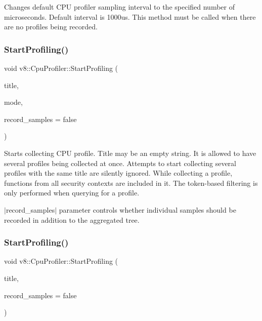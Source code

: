 Changes default C\+PU profiler sampling interval to the specified number of microseconds. Default interval is 1000us. This method must be called when there are no profiles being recorded. \mbox{\label{classv8_1_1CpuProfiler_a65ff4a18ab14143e094e2ea189facabd}} 
\subsubsection{\texorpdfstring{Start\+Profiling()}{StartProfiling()}\hspace{0.1cm}{\footnotesize\ttfamily [1/2]}}
{\footnotesize\ttfamily void v8\+::\+Cpu\+Profiler\+::\+Start\+Profiling (\begin{DoxyParamCaption}\item[{\mbox{\hyperlink{classv8_1_1Local}{Local}}$<$ \mbox{\hyperlink{classv8_1_1String}{String}} $>$}]{title,  }\item[{Cpu\+Profiling\+Mode}]{mode,  }\item[{bool}]{record\+\_\+samples = {\ttfamily false} }\end{DoxyParamCaption})}

Starts collecting C\+PU profile. Title may be an empty string. It is allowed to have several profiles being collected at once. Attempts to start collecting several profiles with the same title are silently ignored. While collecting a profile, functions from all security contexts are included in it. The token-\/based filtering is only performed when querying for a profile.

$\vert$record\+\_\+samples$\vert$ parameter controls whether individual samples should be recorded in addition to the aggregated tree. \mbox{\label{classv8_1_1CpuProfiler_a7a9b75d3d7285d90344e1b8f14e97076}} 
\subsubsection{\texorpdfstring{Start\+Profiling()}{StartProfiling()}\hspace{0.1cm}{\footnotesize\ttfamily [2/2]}}
{\footnotesize\ttfamily void v8\+::\+Cpu\+Profiler\+::\+Start\+Profiling (\begin{DoxyParamCaption}\item[{\mbox{\hyperlink{classv8_1_1Local}{Local}}$<$ \mbox{\hyperlink{classv8_1_1String}{String}} $>$}]{title,  }\item[{bool}]{record\+\_\+samples = {\ttfamily false} }\end{DoxyParamCaption})}


